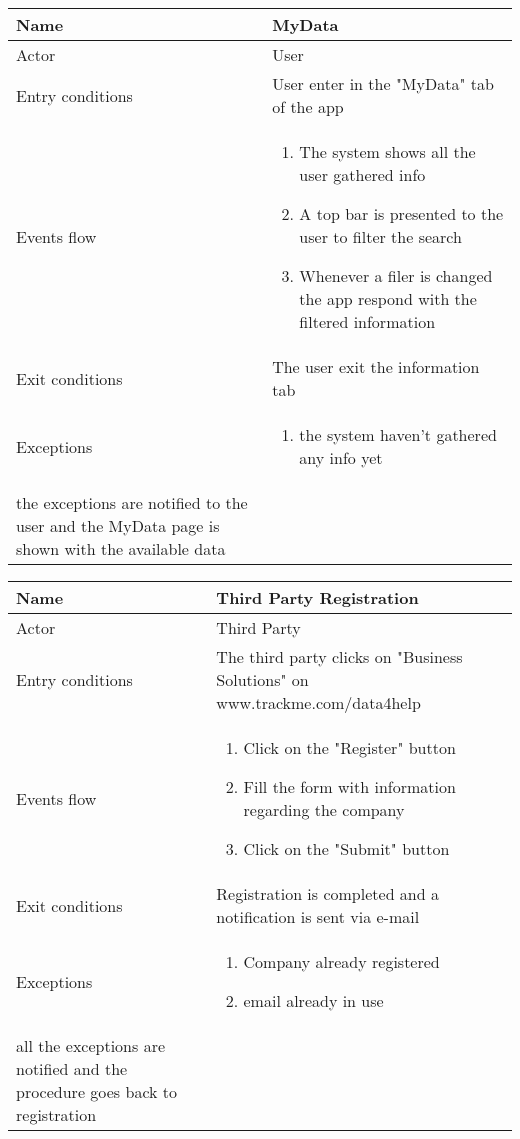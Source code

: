 \begin{table}[]
\begin{tabular}{|l|l|}
\hline
Name             & MyData \\ \hline
Actor            & User \\ \hline
Entry conditions & User enter in the "MyData" tab of the app \\ \hline
Events flow      & \begin{enumerate}
\item The system shows all the user gathered info
\item A top bar is presented to the user to filter the search
\item Whenever a filer is changed the app respond with the filtered information
\end{enumerate} \\ \hline
Exit conditions  & The user exit the information tab \\ \hline
Exceptions       & \begin{enumerate}
\item the system haven't gathered any info yet
\end{enumerate} \\ the exceptions are notified to the user and the MyData page is shown with the available data \hline
\end{tabular}
\end{table}

\begin{table}[]
\begin{tabular}{|l|l|}
\hline
Name             & Third Party Registration \\ \hline
Actor            & Third Party \\ \hline
Entry conditions & The third party clicks on "Business Solutions" on www.trackme.com/data4help \\ \hline
Events flow      & \begin{enumerate}
\item Click on the "Register" button
\item Fill the form with information regarding the company
\item Click on the "Submit" button
\end{enumerate} \\ \hline
Exit conditions  & Registration is completed and a notification is sent via e-mail \\ \hline
Exceptions       & \begin{enumerate}
\item Company already registered
\item email already in use
\end{enumerate}\\ all the exceptions are notified and the procedure goes back to registration \hline
\end{tabular}
\end{table}

